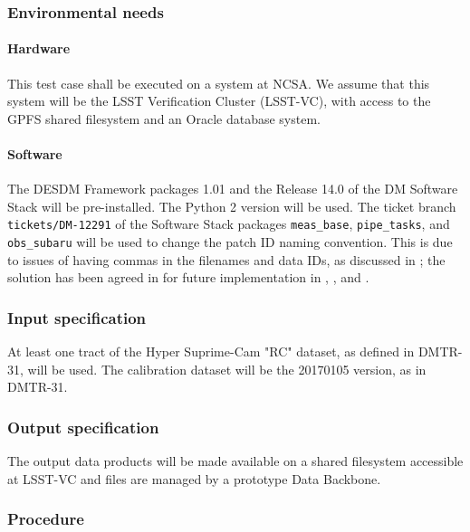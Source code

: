 \subsubsection{Environmental needs}

\paragraph{Hardware}

This test case shall be executed on a system at NCSA.
We assume that this system will be the LSST Verification Cluster (LSST-VC),
with access to the GPFS shared filesystem and an Oracle database system.

\paragraph{Software}\label{sec:software}

The DESDM Framework packages 1.01 and the Release 14.0 of the DM Software Stack will be pre-installed. The Python 2 version will be used.
The ticket branch \texttt{tickets/DM-12291} of the Software Stack packages \texttt{meas{\_}base}, \texttt{pipe{\_}tasks}, and \texttt{obs{\_}subaru} will be used to change the patch ID naming convention.
This is due to issues of having commas in the filenames and data IDs, as discussed in ; the solution has been agreed in  for future implementation in , , and .

\subsubsection{Input specification}\label{sec:input}

At least one tract of the Hyper Suprime-Cam "RC" dataset, as defined in DMTR-31, will be used.
The calibration dataset will be the 20170105 version, as in DMTR-31.


\subsubsection{Output specification}

The output data products will be made available on a shared filesystem accessible at LSST-VC and files are managed by a prototype Data Backbone.

\subsubsection{Procedure}


